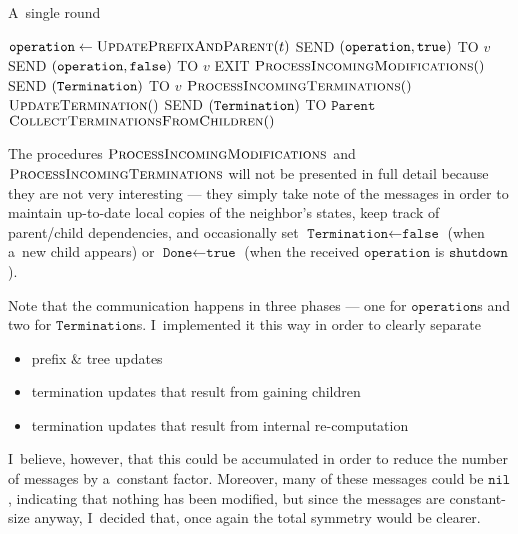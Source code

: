 \documentclass{article}
\DeclarePairedDelimiter{\parenthesesdelimiter}{(}{)}
\def\pars{\parenthesesdelimiter*}
\begin{document}
\begin{algorithm}
\caption{A~single round}
\label{alg:round}
\begin{algorithmic}
 
    \State \(\texttt{operation} \gets \textsc{UpdatePrefixAndParent}(t)\)
    \For{\(v \in N\pars{u}\)}
            \State \textsc{SEND} \(\pars{\texttt{operation}, \texttt{true}}\) \textsc{TO} \(v\) 
        \Else
            \State \textsc{SEND} \(\pars{\texttt{operation}, \texttt{false}}\) \textsc{TO} \(v\)
        \EndIf
    \EndFor
        \State \textsc{EXIT} 
    \EndIf
    \State \(\textsc{ProcessIncomingModifications}()\)
    \For{\(v \in N\pars{u}\)}
        \State \textsc{SEND} \(\pars{\texttt{Termination}}\) \textsc{TO} \(v\)
    \EndFor
    \State \(\textsc{ProcessIncomingTerminations}()\)
    \State \(\textsc{UpdateTermination}()\)
        \State \textsc{SEND} \(\pars{\texttt{Termination}}\) \textsc{TO} \(\texttt{Parent}\)
    \EndIf
    \State \(\textsc{CollectTerminationsFromChildren}()\)
\EndProcedure
\end{algorithmic}
\end{algorithm}
The procedures \(\textsc{ProcessIncomingModifications}\) and \(\textsc{ProcessIncomingTerminations}\) will not be presented in full detail because they are not very interesting --- they simply take note of the messages in order to maintain up-to-date local copies of the neighbor's states, keep track of parent/child dependencies, and occasionally set \(\texttt{Termination} \gets \texttt{false}\) (when a~new child appears) or \(\texttt{Done} \gets \texttt{true}\) (when the received \(\texttt{operation}\) is \(\texttt{shutdown}\)).

Note that the communication happens in three phases --- one for \(\texttt{operation}\)s and two for \(\texttt{Termination}\)s. I~implemented it this way in order to clearly separate
\begin{itemize}
    \item prefix \& tree updates
    \item termination updates that result from gaining children
    \item termination updates that result from internal re-computation
\end{itemize}
I~believe, however, that this could be accumulated in order to reduce the number of messages by a~constant factor. Moreover, many of these messages could be \(\texttt{nil}\), indicating that nothing has been modified, but since the messages are constant-size anyway, I~decided that, once again the total symmetry would be clearer.
\end{document}
